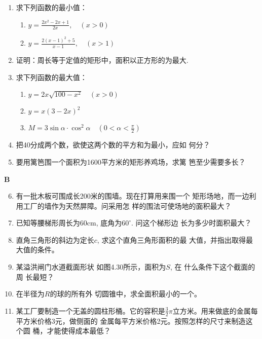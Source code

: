 \begin{enumerate}
    \item 求下列函数的最小值：
\begin{enumerate}[(1)]
    \item $y=\frac{2x^2-2x+1}{2x},\quad (x>0)$
    \item $y=\frac{2(x-1)^2+5}{x-1},\quad (x>1)$
\end{enumerate}

\item 证明：周长等于定值的矩形中，面积以正方形的为最大.

\item 求下列函数的最大值：
\begin{enumerate}[(1)]
    \item $y=2x\sqrt{100-x^2}\quad (x>0)$
    \item $y=x(3-2x)^2$
    \item $M=3\sin\alpha \cdot \cos^2\alpha \quad \left(0<\alpha<\frac{\pi}{2}\right)$
\end{enumerate}

\item 把40分成两个数，欲使这两个数的平方和为最小，应如
何分？
\item 要用篱笆围一个面积为1600平方米的矩形养鸡场，求篱
笆至少需要多长？
\end{enumerate}

\begin{center}
    \bfseries B
\end{center}

\begin{enumerate}\setcounter{enumi}{5}
    \item 有一批木板可围成长200米的围墙。现在打算用来围一个
    矩形场地，而一边利用工厂的墙作为天然屏障。问采用怎
    样的围法可使场地的面积最大？
    \item 已知等腰梯形周长为60cm, 底角为$60^{\circ}$. 问这个梯形边
    长为多少时面积最大？
    \item 直角三角形的斜边为定长$c$, 求这个直角三角形面积的最
    大值，并指出取得最大值的条件。
    \item 某溢洪闸门水道截面形状
    如图4.30所示，面积为$S$, 在
    什么条件下这个截面的周
    长最短？
    \item 在半径为$R$的球的所有外
    切圆锥中，求全面积最小的一个。
    \item 某工厂要制造一个无盖的圆柱形桶。它的容积是$\frac{3}{2}\pi$立方米。用来做底的金属每平方米价格3元，做侧面的
    金属每平方米价格2元。按照怎样的尺寸来制造这个圆
    桶，才能使得成本最低？
\end{enumerate}

